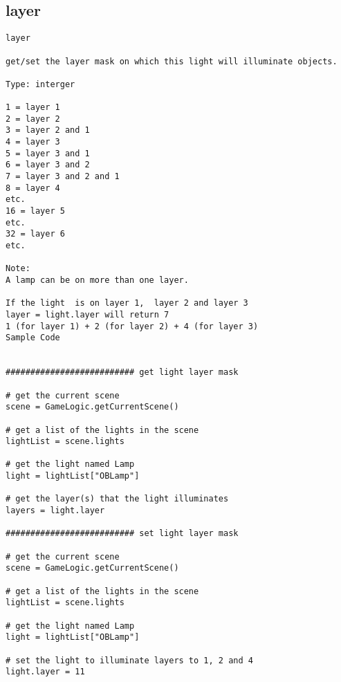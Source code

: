 \subsection{layer}
\begin{verbatim}
layer

get/set the layer mask on which this light will illuminate objects.

Type: interger

1 = layer 1
2 = layer 2
3 = layer 2 and 1
4 = layer 3
5 = layer 3 and 1
6 = layer 3 and 2
7 = layer 3 and 2 and 1
8 = layer 4
etc.
16 = layer 5
etc.
32 = layer 6
etc.

Note:
A lamp can be on more than one layer.

If the light  is on layer 1,  layer 2 and layer 3 
layer = light.layer will return 7
1 (for layer 1) + 2 (for layer 2) + 4 (for layer 3)
Sample Code


########################## get light layer mask

# get the current scene
scene = GameLogic.getCurrentScene()

# get a list of the lights in the scene
lightList = scene.lights

# get the light named Lamp
light = lightList["OBLamp"]

# get the layer(s) that the light illuminates
layers = light.layer

########################## set light layer mask

# get the current scene
scene = GameLogic.getCurrentScene()

# get a list of the lights in the scene
lightList = scene.lights

# get the light named Lamp
light = lightList["OBLamp"]

# set the light to illuminate layers to 1, 2 and 4
light.layer = 11
\end{verbatim}

